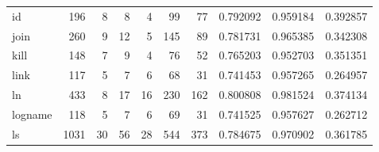 \begin{longtable}{lrrrrrrrrr}
id        &                    196 &                                  8 &                                 8 &                                4 &                                99 &                              77 &                                0.792092 &                               0.959184 &                             0.392857 \\
join      &                    260 &                                  9 &                                12 &                                5 &                               145 &                              89 &                                0.781731 &                               0.965385 &                             0.342308 \\
kill      &                    148 &                                  7 &                                 9 &                                4 &                                76 &                              52 &                                0.765203 &                               0.952703 &                             0.351351 \\
link      &                    117 &                                  5 &                                 7 &                                6 &                                68 &                              31 &                                0.741453 &                               0.957265 &                             0.264957 \\
ln        &                    433 &                                  8 &                                17 &                               16 &                               230 &                             162 &                                0.800808 &                               0.981524 &                             0.374134 \\
logname   &                    118 &                                  5 &                                 7 &                                6 &                                69 &                              31 &                                0.741525 &                               0.957627 &                             0.262712 \\
ls        &                   1031 &                                 30 &                                56 &                               28 &                               544 &                             373 &                                0.784675 &                               0.970902 &                             0.361785 \\

\end{longtable}
